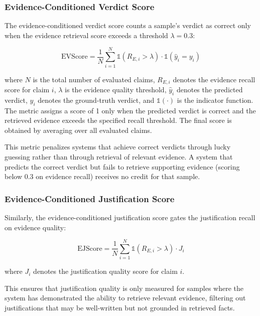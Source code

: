 \subsubsection{Evidence-Conditioned Verdict Score}

The evidence-conditioned verdict score counts a sample's verdict as correct only when the evidence retrieval score exceeds a threshold $\lambda = 0.3$:

\begin{equation}
\text{EVScore}
=
\frac{1}{N}
\sum_{i=1}^{N}
\mathds{1}
\left(
R_{E,i} > \lambda
\right)
\cdot
\mathds{1}
\left(
\hat{y}_i = y_i
\right)
\label{eq:evidence_verdict_score}
\end{equation}

where $N$ is the total number of evaluated claims, $R_{E,i}$ denotes the evidence recall score for claim $i$, $\lambda$ is the evidence quality threshold, $\hat{y}_i$ denotes the predicted verdict, $y_i$ denotes the ground-truth verdict, and $\mathds{1}(\cdot)$ is the indicator function. The metric assigns a score of 1 only when the predicted verdict is correct and the retrieved evidence exceeds the specified recall threshold. The final score is obtained by averaging over all evaluated claims.

This metric penalizes systems that achieve correct verdicts through lucky guessing rather than through retrieval of relevant evidence. A system that predicts the correct verdict but fails to retrieve supporting evidence (scoring below 0.3 on evidence recall) receives no credit for that sample.

\subsubsection{Evidence-Conditioned Justification Score}

Similarly, the evidence-conditioned justification score gates the justification recall on evidence quality:

\begin{equation}
\text{EJScore}
=
\frac{1}{N}
\sum_{i=1}^{N}
\mathds{1}
\left(
R_{E,i} > \lambda
\right)
\cdot
J_i
\label{eq:evidence_justification_score}
\end{equation}

where $J_i$ denotes the justification quality score for claim $i$.

This ensures that justification quality is only measured for samples where the system has demonstrated the ability to retrieve relevant evidence, filtering out justifications that may be well-written but not grounded in retrieved facts.

